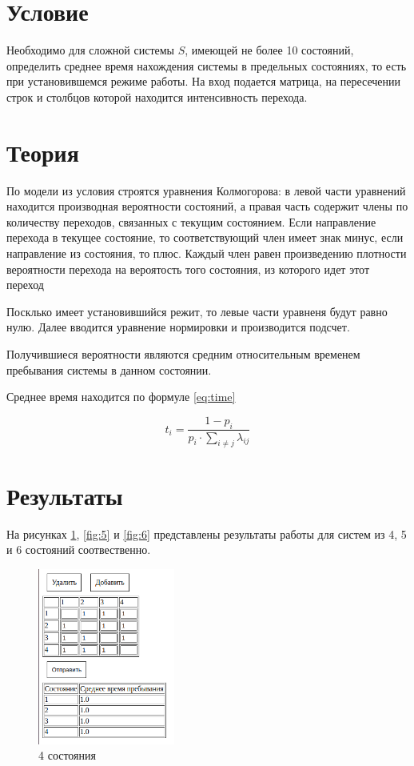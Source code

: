 \section{Условие}

Необходимо для сложной системы $S$, имеющей не более 10 состояний, определить среднее время нахождения системы в предельных состояниях, то есть при установившемся режиме работы. На вход подается матрица, на пересечении строк и столбцов которой находится интенсивность перехода.

\section{Теория}

По модели из условия строятся уравнения Колмогорова: в левой части уравнений находится производная вероятности состояний, а правая часть содержит члены по количеству переходов, связанных с текущим состоянием. Если направление перехода в текущее состояние, то соответствующий член имеет знак минус, если направление из состояния, то плюс. Каждый член равен произведению плотности вероятности перехода на вероятость того состояния, из которого идет этот переход

Посклько имеет установившийся режит, то левые части уравненя будут равно нулю. Далее вводится уравнение нормировки и производится подсчет.

Получившиеся вероятности являются средним относительным временем пребывания системы в данном состоянии.

Среднее время находится по формуле \ref{eq:time}

\begin{equation}\label{eq:time}
    t_i = \frac{1 - p_i}{p_i \cdot \sum_{i \ne j}\lambda_{ij}}
\end{equation}

\section{Результаты}

На рисунках \ref{fig:4}, \ref{fig:5} и \ref{fig:6} представлены результаты работы для систем из 4, 5 и 6 состояний соотвественно.

\begin{figure}[H]
    \centering
    \includegraphics[width=0.4\textwidth]{img/content/4.png}
    \caption{4 состояния}
    \label{fig:4}
\end{figure}

